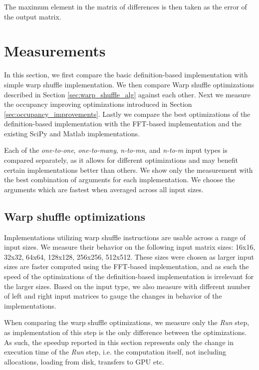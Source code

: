 The maximum element in the matrix of differences is then taken as the error of the output matrix.

\section{Measurements}

In this section, we first compare the basic definition-based implementation with simple warp shuffle implementation. We then compare Warp shuffle optimizations described in Section \ref{sec:warp_shuffle_alg} against each other. Next we measure the occupancy improving optimizations introduced in Section \ref{sec:occupancy_improvements}. Lastly we compare the best optimizations of the definition-based implementation with the FFT-based implementation and the existing SciPy and Matlab implementations.


Each of the \textit{one-to-one}, \textit{one-to-many}, \textit{n-to-mn}, and \textit{n-to-m} input types is compared separately, as it allows for different optimizations and may benefit certain implementations better than others. We show only the measurement with the best combination of arguments for each implementation. We choose the arguments which are fastest when averaged across all input sizes. %


\subsection{Warp shuffle optimizations}
\label{sec:results_warp_shuffle}

Implementations utilizing warp shuffle instructions are usable across a range of input sizes. We measure their behavior on the following input matrix sizes: 16x16, 32x32, 64x64, 128x128, 256x256, 512x512. These sizes were chosen as larger input sizes are faster computed using the FFT-based implementation, and as such the speed of the optimizations of the definition-based implementation is irrelevant for the larger sizes. Based on the input type, we also measure with different number of left and right input matrices to gauge the changes in behavior of the implementations.

When comparing the warp shuffle optimizations, we measure only the \textit{Run} step, as implementation of this step is the only difference between the optimizations. As such, the speedup reported in this section represents only the change in execution time of the \textit{Run} step, i.e. the computation itself, not including allocations, loading from disk, transfers to GPU etc.

